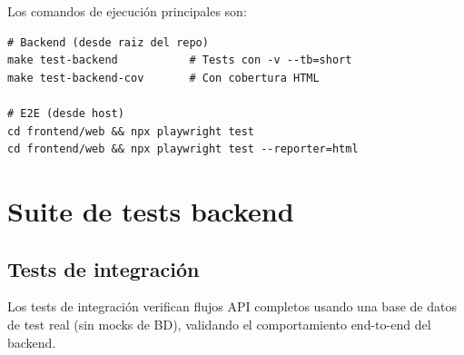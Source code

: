 Los comandos de ejecuci\'on principales son:

\begin{verbatim}
# Backend (desde raiz del repo)
make test-backend           # Tests con -v --tb=short
make test-backend-cov       # Con cobertura HTML

# E2E (desde host)
cd frontend/web && npx playwright test
cd frontend/web && npx playwright test --reporter=html
\end{verbatim}

\section{Suite de tests backend}\label{sec:suite-backend}

\subsection{Tests de integraci\'on}\label{subsec:tests-integracion}

Los tests de integraci\'on verifican flujos API completos usando una base de datos de test real
(sin mocks de BD), validando el comportamiento end-to-end del backend.

